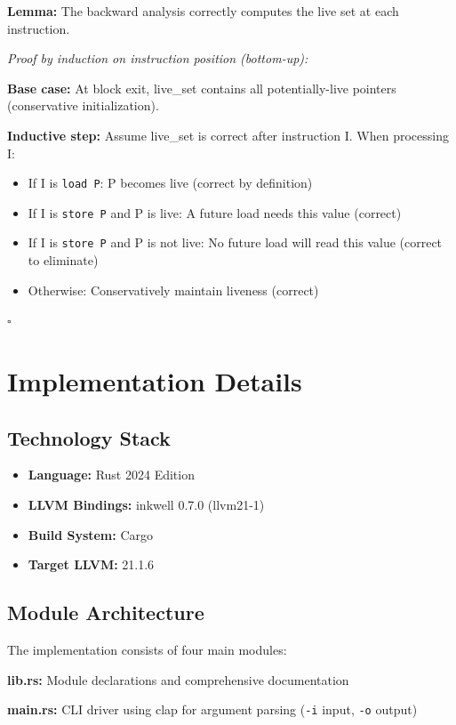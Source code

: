 \documentclass[journal]{IEEEtran}
\begin{document}
\textbf{Lemma:} The backward analysis correctly computes the live set at each instruction.

\textit{Proof by induction on instruction position (bottom-up):}

\textbf{Base case:} At block exit, live\_set contains all potentially-live pointers (conservative initialization).

\textbf{Inductive step:} Assume live\_set is correct after instruction I. When processing I:
\begin{itemize}
\item If I is \texttt{load P}: P becomes live (correct by definition)
\item If I is \texttt{store P} and P is live: A future load needs this value (correct)
\item If I is \texttt{store P} and P is not live: No future load will read this value (correct to eliminate)
\item Otherwise: Conservatively maintain liveness (correct)
\end{itemize}
$\square$

\section{Implementation Details}

\subsection{Technology Stack}

\begin{itemize}
\item \textbf{Language:} Rust 2024 Edition
\item \textbf{LLVM Bindings:} inkwell 0.7.0 (llvm21-1)
\item \textbf{Build System:} Cargo
\item \textbf{Target LLVM:} 21.1.6
\end{itemize}

\subsection{Module Architecture}

The implementation consists of four main modules:

\textbf{lib.rs:} Module declarations and comprehensive documentation

\textbf{main.rs:} CLI driver using clap for argument parsing (\texttt{-i} input, \texttt{-o} output)
\end{document}
